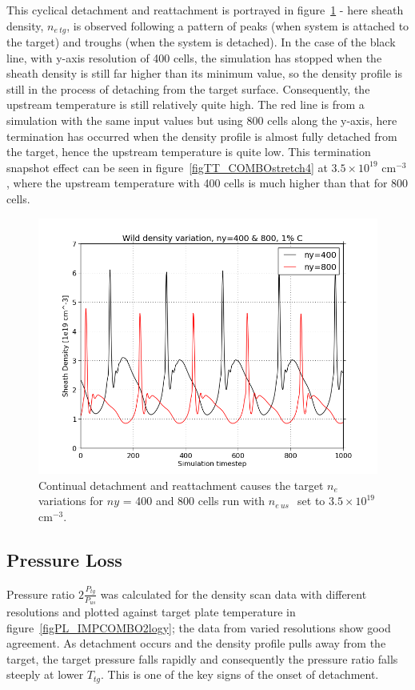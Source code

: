 \documentclass[12pt]{article}  %
\providecommand{\noNe}[1]{{${#1}\times 10^{19}$ cm$^{-3}$}} %
\providecommand{\neus}{$n_{e~us}~$} %
\providecommand{\Netg}{$n_{e~tg}$} %
\providecommand{\ttg}{$T_{tg}$} %
\begin{document}
This cyclical detachment and reattachment is portrayed in figure~\ref{figny400800r35netg} - here sheath density, \Netg, is observed following a pattern of peaks (when system is attached to the target) and troughs (when the system is detached). In the case of the black line, with y-axis resolution of 400 cells, the simulation has stopped when the sheath density is still far higher than its minimum value, so the density profile is still in the process of detaching from the target surface. Consequently, the upstream temperature is still relatively quite high. The red line is from a simulation with the same input values but using 800 cells along the y-axis, here termination has occurred when the density profile is almost fully detached from the target, hence the upstream temperature is quite low. This termination snapshot effect can be seen in figure~\ref{figTT_COMBOstretch4} at \noNe{3.5}, where the upstream temperature with 400 cells is much higher than that for 800 cells.

\begin{figure}
\includegraphics[scale=0.5]{Figures/sol1d/ny400800r35netg.png}
\centering
\caption{Continual detachment and reattachment causes the target $n_e$ variations for $ny$ = 400 and 800 cells run with \neus~set to \noNe{3.5}.}\label{figny400800r35netg}
\end{figure}

\subsection{Pressure Loss}\label{ssecPloss}
Pressure ratio $2\frac{P_{tg}}{P_{us}}$ was calculated for the density scan data with different resolutions and plotted against target plate temperature in figure~\ref{figPL_IMPCOMBO2logy}; the data from varied resolutions show good agreement. As detachment occurs and the density profile pulls away from the target, the target pressure falls rapidly and consequently the pressure ratio falls steeply at lower \ttg. This is one of the key signs of the onset of detachment.
\end{document}
